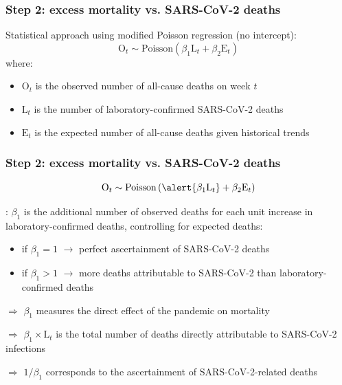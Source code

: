 \documentclass[10pt]{beamer}
\begin{document}
\begin{frame}
\frametitle{Step 2: excess mortality vs. SARS-CoV-2 deaths}
\alert{Statistical approach} using modified Poisson regression (no intercept):
$$\text{O}_{t} \sim \text{Poisson}\left( \beta_1\text{L}_{t} + \beta_2\text{E}_{t} \right)$$
where:
\begin{itemize}
\item $\text{O}_{t}$ is the observed number of all-cause deaths on week $t$
\item $\text{L}_{t}$ is the number of laboratory-confirmed SARS-CoV-2 deaths
\item $\text{E}_{t}$ is the expected number of all-cause deaths given historical trends
\end{itemize}
\end{frame}


\begin{frame}
\frametitle{Step 2: excess mortality vs. SARS-CoV-2 deaths}
$$\text{O}_{t} \sim \text{Poisson}\left( \alert{\beta_1\text{L}_{t}} + \beta_2\text{E}_{t} \right)$$
\bigskip

\underline{}: $\beta_1$ is the additional number of observed deaths \alert{for each unit increase in laboratory-confirmed deaths}, controlling for expected deaths:
	\begin{itemize}
		\item if $\beta_1=1$ $\rightarrow$ perfect ascertainment of SARS-CoV-2 deaths
		\item if $\beta_1>1$ $\rightarrow$ more deaths attributable to SARS-CoV-2 than laboratory-confirmed deaths
	\end{itemize}
\bigskip

\alert{$\Rightarrow$} $\beta_1$ measures the \alert{direct effect} of the pandemic on mortality 
\bigskip

\alert{$\Rightarrow$} $\beta_1 \times \text{L}_{t}$ is the total number of deaths directly attributable to SARS-CoV-2 infections
\bigskip

\alert{$\Rightarrow$} $1/\beta_1$ corresponds to the ascertainment of SARS-CoV-2-related deaths

\end{frame}
\end{document}

